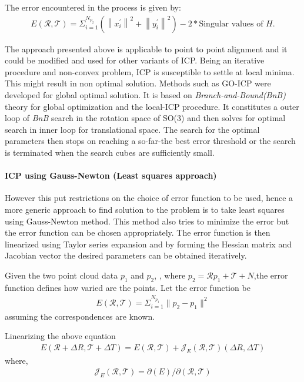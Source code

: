 The error encountered in the process is given by:
\begin{gather}  
E(\mathcal{R}, \mathcal{T}) = \Sigma_{i=1}^{N_{p_2}}(\left\lVert x_i^{'} \right\rVert^2 + \left\lVert y_i^{'} \right\rVert^2) - 2* \text{Singular values of } H.
\end{gather}

The approach presented above is applicable to point to point alignment and it could be modified and used for other variants of ICP. Being an iterative procedure and non-convex problem, ICP is susceptible to settle at local minima. This might result in non optimal solution. Methods such as GO-ICP \cite{Yang_2016} were developed for global optimal solution. It is based on \textit{Branch-and-Bound(BnB)} theory for global optimization and the local-ICP procedure. It constitutes a outer loop of \textit{BnB} search in the rotation space of SO(3) and then solves for optimal search in inner loop for translational space. The search for the optimal parameters then stops on reaching a so-far-the best error threshold or the search is terminated when the search cubes are sufficiently small. 
\par
\paragraph{ICP using Gauss-Newton (Least squares approach)}
However this put restrictions on the choice of error function to be used, hence a more generic approach to find solution to the problem is to take least squares using Gauss-Newton method. This method also tries to minimize the error but the error function can be chosen appropriately. The error function is then linearized using Taylor series expansion and by forming the Hessian matrix and Jacobian vector the desired parameters can be obtained iteratively. 
\par
Given the two point cloud data $p_1$ and $p_2$, , where $p_2 = \mathcal{R}p_1 + \mathcal{T} + N$,the error function defines how varied are the points.
Let the error function be
\begin{gather} 
    E(\mathcal{R}, \mathcal{T}) = \Sigma_{i=1}^{N_{p_1}}\lVert p_2 -  p_1 \rVert^2
\end{gather}
assuming the correspondences are known.
\par
Linearizing the above equation
\begin{gather} 
    E(\mathcal{R}+\Delta{R} , \mathcal{T}+ \Delta{T}) = E(\mathcal{R}, \mathcal{T}) + \mathcal{J}_E(\mathcal{R}, \mathcal{T})(\Delta{R} ,\Delta{T})
\end{gather}
where,
\begin{gather} 
    \mathcal{J}_E(\mathcal{R}, \mathcal{T}) = \partial (E) / \partial (\mathcal{R}, \mathcal{T})
\end{gather}

